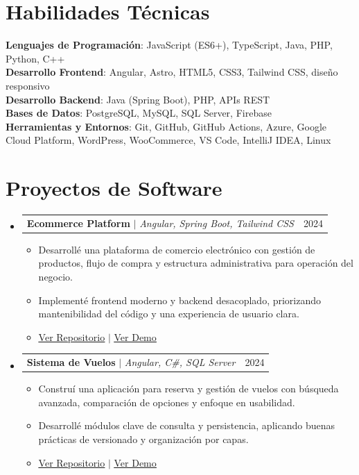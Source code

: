 \documentclass[letterpaper,11pt]{article}
\makeatletter
\newcommand{\resumeItem}[1]{
  \item\small{
    {#1 \vspace{-2pt}}
  }
}
\newcommand{\resumeProjectHeading}[2]{
    \item
    \begin{tabular*}{0.97\textwidth}{l@{\extracolsep{\fill}}r}
      \small#1 & #2 \\
    \end{tabular*}\vspace{-7pt}
}
\newcommand{\resumeSubHeadingListStart}{\begin{itemize}[leftmargin=0.15in, label={}]}
\newcommand{\resumeSubHeadingListEnd}{\end{itemize}}
\newcommand{\resumeItemListStart}{\begin{itemize}}
\newcommand{\resumeItemListEnd}{\end{itemize}\vspace{-5pt}}
\makeatother
\begin{document}
\section{Habilidades Técnicas}
 \begin{itemize}[leftmargin=0.15in, label={}]
    \small{\item{
     \textbf{Lenguajes de Programación}{: JavaScript (ES6+), TypeScript, Java, PHP, Python, C++} \\
     \textbf{Desarrollo Frontend}{: Angular, Astro, HTML5, CSS3, Tailwind CSS, diseño responsivo} \\
     \textbf{Desarrollo Backend}{: Java (Spring Boot), PHP, APIs REST} \\
     \textbf{Bases de Datos}{: PostgreSQL, MySQL, SQL Server, Firebase} \\
     \textbf{Herramientas y Entornos}{: Git, GitHub, GitHub Actions, Azure, Google Cloud Platform, WordPress, WooCommerce, VS Code, IntelliJ IDEA, Linux}
    }}
 \end{itemize}

\section{Proyectos de Software}
    \resumeSubHeadingListStart
      \resumeProjectHeading
          {\textbf{Ecommerce Platform} $|$ \emph{Angular, Spring Boot, Tailwind CSS}}{2024}
          \resumeItemListStart
            \resumeItem{Desarrollé una plataforma de comercio electrónico con gestión de productos, flujo de compra y estructura administrativa para operación del negocio.}
            \resumeItem{Implementé frontend moderno y backend desacoplado, priorizando mantenibilidad del código y una experiencia de usuario clara.}
            \resumeItem{\href{https://github.com/AlexiP18/Ecommerce-Spring-Boot}{\underline{Ver Repositorio}} $|$ \href{https://portafolio-personal-blue-phi.vercel.app/proyectos}{\underline{Ver Demo}}}
          \resumeItemListEnd
      
      \resumeProjectHeading
          {\textbf{Sistema de Vuelos} $|$ \emph{Angular, C\#, SQL Server}}{2024}
          \resumeItemListStart
            \resumeItem{Construí una aplicación para reserva y gestión de vuelos con búsqueda avanzada, comparación de opciones y enfoque en usabilidad.}
            \resumeItem{Desarrollé módulos clave de consulta y persistencia, aplicando buenas prácticas de versionado y organización por capas.}
            \resumeItem{\href{https://github.com/AlexiP18/FlightBookings}{\underline{Ver Repositorio}} $|$ \href{https://portafolio-personal-blue-phi.vercel.app/proyectos}{\underline{Ver Demo}}}
          \resumeItemListEnd
    \resumeSubHeadingListEnd
\end{document}
